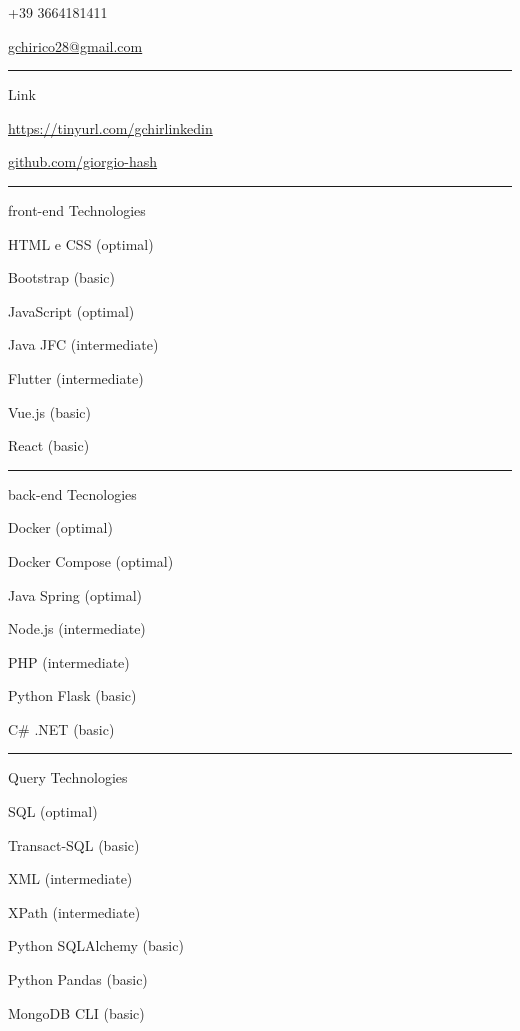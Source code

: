 \documentclass[a4paper]{letter}
\begin{document}
\begin{minipage}[t]{0.30\textwidth}
\faPhone \quad +39 3664181411

\faEnvelope \quad \href{mailto://gchirico28@gmail.com}{gchirico28@gmail.com}

\rule{\linewidth}{0.4pt}

{\large Link}

\faLinkedin \quad \href{https://tinyurl.com/gchirlinkedin}{https://tinyurl.com/gchirlinkedin}

\faGithub \quad \href{https://github.com/giorgio-hash}{github.com/giorgio-hash}

\rule{\linewidth}{0.4pt}

{\large front-end Technologies}

\faCode \quad HTML e CSS (optimal)

\faCode \quad Bootstrap (basic)

\faCode \quad JavaScript (optimal)

\faCode \quad Java JFC (intermediate)

\faCode \quad Flutter (intermediate)

\faCode \quad Vue.js (basic)

\faCode \quad React (basic)



\rule{\linewidth}{0.4pt}

{\large back-end Tecnologies}

\faCode \quad Docker (optimal)

\faCode \quad Docker Compose (optimal)

\faCode \quad Java Spring (optimal)

\faCode \quad Node.js (intermediate)

\faCode \quad PHP (intermediate)

\faCode \quad Python Flask (basic)

\faCode \quad C\# .NET (basic)

\rule{\linewidth}{0.4pt}


{\large Query Technologies}

\faCode \quad SQL (optimal)

\faCode \quad Transact-SQL (basic)

\faCode \quad XML (intermediate)

\faCode \quad XPath (intermediate)

\faCode \quad Python SQLAlchemy (basic)

\faCode \quad Python Pandas (basic)

\faCode \quad MongoDB CLI (basic)



\end{minipage}
\end{document}
